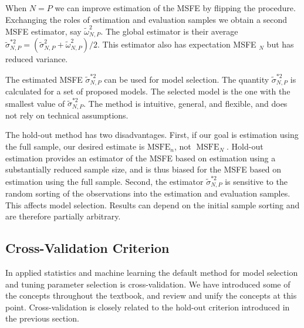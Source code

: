 \documentclass[10pt]{article}
\begin{document}
When $N=P$ we can improve estimation of the MSFE by flipping the procedure. Exchanging the roles of estimation and evaluation samples we obtain a second MSFE estimator, say $\widetilde{\omega}_{N, P}^{2}$. The global estimator is their average $\widetilde{\sigma}_{N, P}^{* 2}=\left(\widetilde{\sigma}_{N, P}^{2}+\widetilde{\omega}_{N, P}^{2}\right) / 2$. This estimator also has expectation MSFE ${ }_{N}$ but has reduced variance.

The estimated MSFE $\widetilde{\sigma}_{N, P}^{* 2}$ can be used for model selection. The quantity $\widetilde{\sigma}_{N, P}^{* 2}$ is calculated for a set of proposed models. The selected model is the one with the smallest value of $\widetilde{\sigma}_{N, P}^{* 2}$. The method is intuitive, general, and flexible, and does not rely on technical assumptions.

The hold-out method has two disadvantages. First, if our goal is estimation using the full sample, our desired estimate is $\mathrm{MSFE}_{n}$, not $\operatorname{MSFE}_{N}$. Hold-out estimation provides an estimator of the MSFE based on estimation using a substantially reduced sample size, and is thus biased for the MSFE based on estimation using the full sample. Second, the estimator $\widetilde{\sigma}_{N, P}^{* 2}$ is sensitive to the random sorting of the observations into the estimation and evaluation samples. This affects model selection. Results can depend on the initial sample sorting and are therefore partially arbitrary.

\subsection{Cross-Validation Criterion}
In applied statistics and machine learning the default method for model selection and tuning parameter selection is cross-validation. We have introduced some of the concepts throughout the textbook, and review and unify the concepts at this point. Cross-validation is closely related to the hold-out criterion introduced in the previous section.
\end{document}
